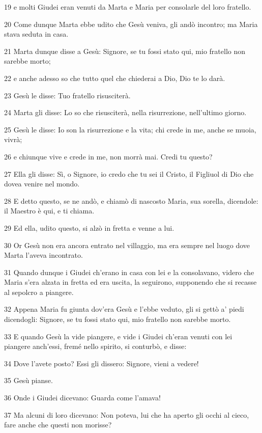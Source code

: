\par 19 e molti Giudei eran venuti da Marta e Maria per consolarle del loro fratello.
\par 20 Come dunque Marta ebbe udito che Gesù veniva, gli andò incontro; ma Maria stava seduta in casa.
\par 21 Marta dunque disse a Gesù: Signore, se tu fossi stato qui, mio fratello non sarebbe morto;
\par 22 e anche adesso so che tutto quel che chiederai a Dio, Dio te lo darà.
\par 23 Gesù le disse: Tuo fratello risusciterà.
\par 24 Marta gli disse: Lo so che risusciterà, nella risurrezione, nell'ultimo giorno.
\par 25 Gesù le disse: Io son la risurrezione e la vita; chi crede in me, anche se muoia, vivrà;
\par 26 e chiunque vive e crede in me, non morrà mai. Credi tu questo?
\par 27 Ella gli disse: Sì, o Signore, io credo che tu sei il Cristo, il Figliuol di Dio che dovea venire nel mondo.
\par 28 E detto questo, se ne andò, e chiamò di nascosto Maria, sua sorella, dicendole: il Maestro è qui, e ti chiama.
\par 29 Ed ella, udito questo, si alzò in fretta e venne a lui.
\par 30 Or Gesù non era ancora entrato nel villaggio, ma era sempre nel luogo dove Marta l'aveva incontrato.
\par 31 Quando dunque i Giudei ch'erano in casa con lei e la consolavano, videro che Maria s'era alzata in fretta ed era uscita, la seguirono, supponendo che si recasse al sepolcro a piangere.
\par 32 Appena Maria fu giunta dov'era Gesù e l'ebbe veduto, gli si gettò a' piedi dicendogli: Signore, se tu fossi stato qui, mio fratello non sarebbe morto.
\par 33 E quando Gesù la vide piangere, e vide i Giudei ch'eran venuti con lei piangere anch'essi, fremé nello spirito, si conturbò, e disse:
\par 34 Dove l'avete posto? Essi gli dissero: Signore, vieni a vedere!
\par 35 Gesù pianse.
\par 36 Onde i Giudei dicevano: Guarda come l'amava!
\par 37 Ma alcuni di loro dicevano: Non poteva, lui che ha aperto gli occhi al cieco, fare anche che questi non morisse?
